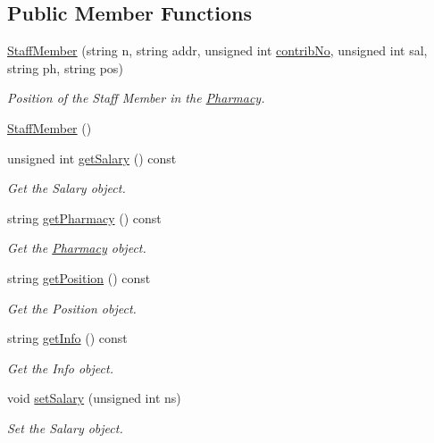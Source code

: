 \subsection*{Public Member Functions}
\begin{DoxyCompactItemize}
\item 
\hyperlink{classStaffMember_a1e9921baaffb1e708b77f3488c78684b}{Staff\+Member} (string n, string addr, unsigned int \hyperlink{classPerson_a55eea8ffb71b88d84ea43a6be15a2eb4}{contrib\+No}, unsigned int sal, string ph, string pos)
\begin{DoxyCompactList}\small\item\em Position of the Staff Member in the \hyperlink{classPharmacy}{Pharmacy}. \end{DoxyCompactList}\item 
\hyperlink{classStaffMember_ac29edb372cd676446075d72bbb0d7de6}{Staff\+Member} ()
\item 
unsigned int \hyperlink{classStaffMember_affc762af53afc6fcbb7c29a362de05bc}{get\+Salary} () const
\begin{DoxyCompactList}\small\item\em Get the Salary object. \end{DoxyCompactList}\item 
string \hyperlink{classStaffMember_a94c742e2577c13695fef27af507e153b}{get\+Pharmacy} () const
\begin{DoxyCompactList}\small\item\em Get the \hyperlink{classPharmacy}{Pharmacy} object. \end{DoxyCompactList}\item 
string \hyperlink{classStaffMember_a7ae61e5f21a3131f3ed6d9e2be0f445f}{get\+Position} () const
\begin{DoxyCompactList}\small\item\em Get the Position object. \end{DoxyCompactList}\item 
string \hyperlink{classStaffMember_ad9db2f7dc662950ea2e7e420285e5ea5}{get\+Info} () const
\begin{DoxyCompactList}\small\item\em Get the Info object. \end{DoxyCompactList}\item 
void \hyperlink{classStaffMember_ab2d7ec284f4c34d7951b3168106bf092}{set\+Salary} (unsigned int ns)
\begin{DoxyCompactList}\small\item\em Set the Salary object. \end{DoxyCompactList}\item 

\end{DoxyCompactItemize}

